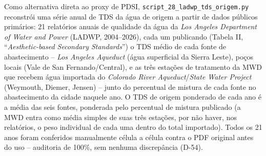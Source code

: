 Como alternativa direta ao proxy de PDSI, \texttt{script\_28\_ladwp\_tds\_origem.py} reconstrói uma série anual de TDS da água de origem a partir de dados públicos primários: 21 relatórios anuais de qualidade da água da \textit{Los Angeles Department of Water and Power} (LADWP, 2004--2026), cada um publicando (Tabela II, ``\textit{Aesthetic-based Secondary Standards}'') o TDS médio de cada fonte de abastecimento -- \textit{Los Angeles Aqueduct} (água superficial da Sierra Leste), poços locais (Vale de San Fernando/Central), e as três estações de tratamento da MWD que recebem água importada do \textit{Colorado River Aqueduct}/\textit{State Water Project} (Weymouth, Diemer, Jensen) -- junto do percentual de mistura de cada fonte no abastecimento da cidade naquele ano. O TDS de origem ponderado de cada ano é a média das seis fontes, ponderada pelo percentual de mistura publicado (a MWD entra como média simples de suas três estações, por não haver, nos relatórios, o peso individual de cada uma dentro do total importado). Todos os 21 anos foram conferidos manualmente célula a célula contra o PDF original antes do uso -- auditoria de 100\%, sem nenhuma discrepância (D-54).
